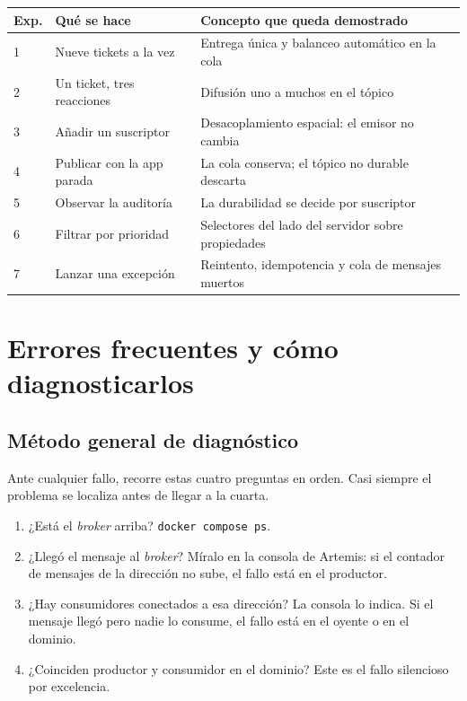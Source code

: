 \documentclass[11pt,a4paper]{book}
\begin{document}
\begin{center}
	\small
	\begin{tabularx}{\textwidth}{@{}p{1.1cm}p{5.0cm}X@{}}
		\toprule
		\textbf{Exp.} & \textbf{Qué se hace} & \textbf{Concepto que queda demostrado} \\
		\midrule
		1 & Nueve tickets a la vez & Entrega única y balanceo automático en la cola \\
		2 & Un ticket, tres reacciones & Difusión uno a muchos en el tópico \\
		3 & Añadir un suscriptor & Desacoplamiento espacial: el emisor no cambia \\
		4 & Publicar con la app parada & La cola conserva; el tópico no durable descarta \\
		5 & Observar la auditoría & La durabilidad se decide por suscriptor \\
		6 & Filtrar por prioridad & Selectores del lado del servidor sobre propiedades \\
		7 & Lanzar una excepción & Reintento, idempotencia y cola de mensajes muertos \\
		\bottomrule
	\end{tabularx}
\end{center}

\chapter{Errores frecuentes y cómo diagnosticarlos}
\label{cap:errores}

\section{Método general de diagnóstico}

Ante cualquier fallo, recorre estas cuatro preguntas en orden.
Casi siempre el problema se localiza antes de llegar a la cuarta.

\begin{enumerate}[leftmargin=1.8em,itemsep=3pt,topsep=3pt]
	\item ¿Está el \emph{broker} arriba? \texttt{docker compose ps}.
	\item ¿Llegó el mensaje al \emph{broker}? Míralo en la consola de Artemis: si el contador de mensajes de la dirección no sube, el fallo está en el productor.
	\item ¿Hay consumidores conectados a esa dirección? La consola lo indica. Si el mensaje llegó pero nadie lo consume, el fallo está en el oyente o en el dominio.
	\item ¿Coinciden productor y consumidor en el dominio? Este es el fallo silencioso por excelencia.
\end{enumerate}
\end{document}
